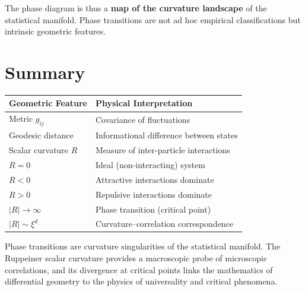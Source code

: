 The phase diagram is thus a \textbf{map of the curvature landscape} of the statistical manifold. Phase transitions are not ad hoc empirical classifications but intrinsic geometric features.

\section{Summary}

\begin{table}[H]
\centering
\renewcommand{\arraystretch}{1.6}
\begin{tabular}{ll}
\toprule
\textbf{Geometric Feature} & \textbf{Physical Interpretation} \\
\midrule
Metric $g_{ij}$ & Covariance of fluctuations \\
Geodesic distance & Informational difference between states \\
Scalar curvature $R$ & Measure of inter-particle interactions \\
$R = 0$ & Ideal (non-interacting) system \\
$R < 0$ & Attractive interactions dominate \\
$R > 0$ & Repulsive interactions dominate \\
$|R| \to \infty$ & Phase transition (critical point) \\
$|R| \sim \xi^d$ & Curvature--correlation correspondence \\
\bottomrule
\end{tabular}
\end{table}

Phase transitions are curvature singularities of the statistical manifold. The Ruppeiner scalar curvature provides a macroscopic probe of microscopic correlations, and its divergence at critical points links the mathematics of differential geometry to the physics of universality and critical phenomena.
